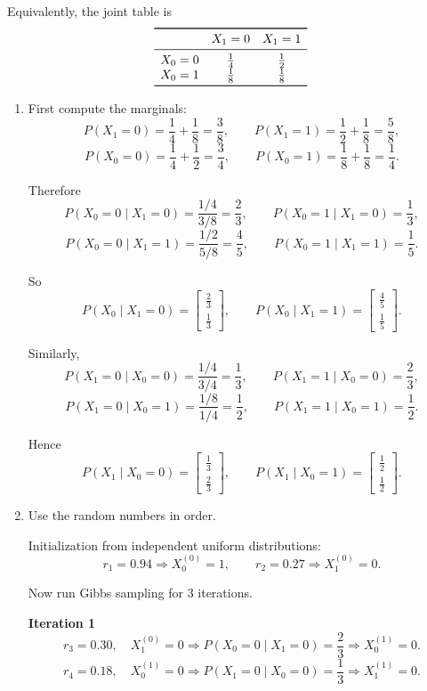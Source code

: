 \documentclass[11pt]{article}
\begin{document}
Equivalently, the joint table is
\[
\begin{array}{c c c}
\toprule
 & X_1=0 & X_1=1\\
\midrule
X_0=0 & \tfrac14 & \tfrac12\\
X_0=1 & \tfrac18 & \tfrac18\\
\bottomrule
\end{array}
\]

\begin{enumerate}[label=\alph*)]
\item First compute the marginals:
\[
P(X_1=0)=\frac14+\frac18=\frac38,\qquad
P(X_1=1)=\frac12+\frac18=\frac58,
\]
\[
P(X_0=0)=\frac14+\frac12=\frac34,\qquad
P(X_0=1)=\frac18+\frac18=\frac14.
\]

Therefore
\[
P(X_0=0\mid X_1=0)=\frac{1/4}{3/8}=\frac23,\qquad
P(X_0=1\mid X_1=0)=\frac13,
\]
\[
P(X_0=0\mid X_1=1)=\frac{1/2}{5/8}=\frac45,\qquad
P(X_0=1\mid X_1=1)=\frac15.
\]

So
\[
\boxed{
P(X_0\mid X_1=0)=
\begin{bmatrix}
\tfrac23\\[2pt]
\tfrac13
\end{bmatrix},
\qquad
P(X_0\mid X_1=1)=
\begin{bmatrix}
\tfrac45\\[2pt]
\tfrac15
\end{bmatrix}.}
\]

Similarly,
\[
P(X_1=0\mid X_0=0)=\frac{1/4}{3/4}=\frac13,\qquad
P(X_1=1\mid X_0=0)=\frac23,
\]
\[
P(X_1=0\mid X_0=1)=\frac{1/8}{1/4}=\frac12,\qquad
P(X_1=1\mid X_0=1)=\frac12.
\]

Hence
\[
\boxed{
P(X_1\mid X_0=0)=
\begin{bmatrix}
\tfrac13\\[2pt]
\tfrac23
\end{bmatrix},
\qquad
P(X_1\mid X_0=1)=
\begin{bmatrix}
\tfrac12\\[2pt]
\tfrac12
\end{bmatrix}.}
\]

\item Use the random numbers in order.

Initialization from independent uniform distributions:
\[
r_1=0.94 \Rightarrow X_0^{(0)}=1,\qquad
r_2=0.27 \Rightarrow X_1^{(0)}=0.
\]

Now run Gibbs sampling for 3 iterations.

\textbf{Iteration 1}
\[
r_3=0.30,\quad X_1^{(0)}=0
\Rightarrow
P(X_0=0\mid X_1=0)=\frac23
\Rightarrow X_0^{(1)}=0.
\]
\[
r_4=0.18,\quad X_0^{(1)}=0
\Rightarrow
P(X_1=0\mid X_0=0)=\frac13
\Rightarrow X_1^{(1)}=0.
\]


\end{enumerate}
\end{document}
